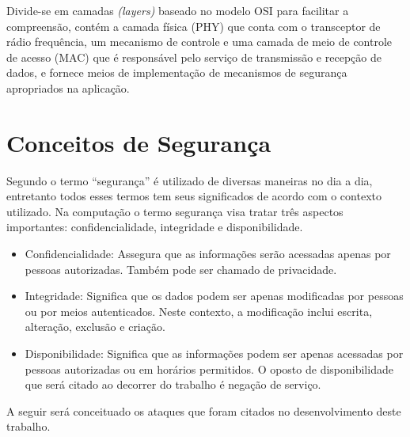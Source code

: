 \par Divide-se em camadas \emph{(layers)} baseado no modelo OSI para facilitar a compreens\~ao, cont\'em a camada f\'isica (PHY) que conta com o transceptor de r\'adio frequ\^encia, um mecanismo de controle e uma camada de meio de controle de acesso (MAC) que \'e respons\'avel pelo servi\c{c}o de transmiss\~ao e recep\c{c}\~ao de dados, e fornece meios de implementa\c{c}\~ao de mecanismos de seguran\c{c}a apropriados na aplica\c{c}\~ao.

\section{Conceitos de Seguran\c{c}a}
\par Segundo  o termo ``seguran\c{c}a'' \'e utilizado de diversas maneiras no dia a dia, entretanto todos esses termos tem seus significados de acordo com o contexto utilizado. Na computa\c{c}\~ao o termo seguran\c{c}a visa tratar tr\^es aspectos importantes: confidencialidade, integridade e disponibilidade.
\begin{itemize}
    \item Confidencialidade: Assegura que as informa\c{c}\~oes ser\~ao acessadas apenas por pessoas autorizadas. Tamb\'em pode ser chamado de privacidade.

    \item Integridade: Significa que os dados podem ser apenas modificadas por pessoas ou por meios autenticados. Neste contexto, a modifica\c{c}\~ao inclui escrita, altera\c{c}\~ao, exclus\~ao e cria\c{c}\~ao.

    \item Disponibilidade: Significa que as informa\c{c}\~oes podem ser apenas acessadas por pessoas autorizadas ou em hor\'arios permitidos. O oposto de disponibilidade que ser\'a citado ao decorrer do trabalho \'e nega\c{c}\~ao de servi\c{c}o.
\end{itemize}

\par A seguir ser\'a conceituado os ataques que foram citados no desenvolvimento deste trabalho.

